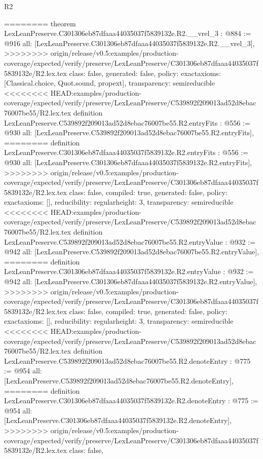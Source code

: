 \begin{lexlean}{R2}
\begin{coremodule}
{{{{{{{{{{{{{{{========
theorem LexLeanPreserve.C301306eb87dfaaa44035037f5839132e.R2.__vrel_3 : @884 := @916 {
  all: [LexLeanPreserve.C301306eb87dfaaa44035037f5839132e.R2.__vrel_3],
>>>>>>>> origin/release/v0.5:examples/production-coverage/expected/verify/preserve/LexLeanPreserve/C301306eb87dfaaa44035037f5839132e/R2.lex.tex
  class: false,
  generated: false,
  policy: exact{axioms: [Classical.choice, Quot.sound, propext]},
  transparency: semireducible
}
<<<<<<<< HEAD:examples/production-coverage/expected/verify/preserve/LexLeanPreserve/C539892f209013ad52d8ebac76007be55/R2.lex.tex
definition LexLeanPreserve.C539892f209013ad52d8ebac76007be55.R2.entryFits : @556 := @930 {
  all: [LexLeanPreserve.C539892f209013ad52d8ebac76007be55.R2.entryFits],
========
definition LexLeanPreserve.C301306eb87dfaaa44035037f5839132e.R2.entryFits : @556 := @930 {
  all: [LexLeanPreserve.C301306eb87dfaaa44035037f5839132e.R2.entryFits],
>>>>>>>> origin/release/v0.5:examples/production-coverage/expected/verify/preserve/LexLeanPreserve/C301306eb87dfaaa44035037f5839132e/R2.lex.tex
  class: false,
  compiled: true,
  generated: false,
  policy: exact{axioms: []},
  reducibility: regular{height: 3},
  transparency: semireducible
}
<<<<<<<< HEAD:examples/production-coverage/expected/verify/preserve/LexLeanPreserve/C539892f209013ad52d8ebac76007be55/R2.lex.tex
definition LexLeanPreserve.C539892f209013ad52d8ebac76007be55.R2.entryValue : @932 := @942 {
  all: [LexLeanPreserve.C539892f209013ad52d8ebac76007be55.R2.entryValue],
========
definition LexLeanPreserve.C301306eb87dfaaa44035037f5839132e.R2.entryValue : @932 := @942 {
  all: [LexLeanPreserve.C301306eb87dfaaa44035037f5839132e.R2.entryValue],
>>>>>>>> origin/release/v0.5:examples/production-coverage/expected/verify/preserve/LexLeanPreserve/C301306eb87dfaaa44035037f5839132e/R2.lex.tex
  class: false,
  compiled: true,
  generated: false,
  policy: exact{axioms: []},
  reducibility: regular{height: 3},
  transparency: semireducible
}
<<<<<<<< HEAD:examples/production-coverage/expected/verify/preserve/LexLeanPreserve/C539892f209013ad52d8ebac76007be55/R2.lex.tex
definition LexLeanPreserve.C539892f209013ad52d8ebac76007be55.R2.denoteEntry : @775 := @954 {
  all: [LexLeanPreserve.C539892f209013ad52d8ebac76007be55.R2.denoteEntry],
========
definition LexLeanPreserve.C301306eb87dfaaa44035037f5839132e.R2.denoteEntry : @775 := @954 {
  all: [LexLeanPreserve.C301306eb87dfaaa44035037f5839132e.R2.denoteEntry],
>>>>>>>> origin/release/v0.5:examples/production-coverage/expected/verify/preserve/LexLeanPreserve/C301306eb87dfaaa44035037f5839132e/R2.lex.tex
  class: false,
}}}}}}}}}}}}}}}}}}}
\end{coremodule}
\end{lexlean}
